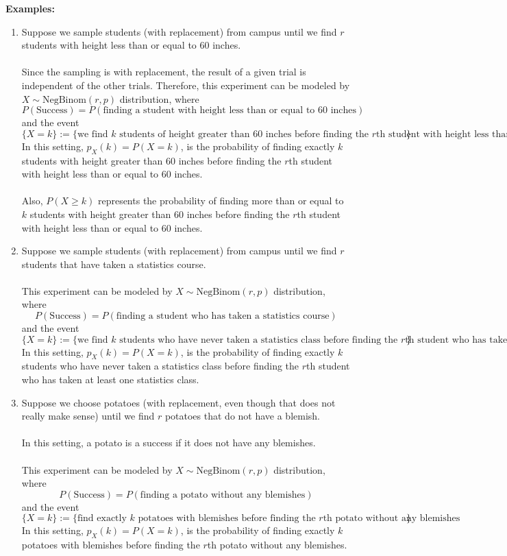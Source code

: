 \documentclass{article}
\begin{document}
\textbf{Examples:}
\begin{enumerate}
    \item Suppose we sample students (with replacement) from campus until we find \( r \) students with height less than or equal to 60 inches. \\\\
    Since the sampling is with replacement, the result of a given trial is independent of the other trials. Therefore, this experiment can be modeled by \( X \sim \text{NegBinom}(r, p) \) distribution, where
    \[
    P(\text{Success}) = P(\text{finding a student with height less than or equal to 60 inches})
    \]
    and the event
    \[
    \{ X = k \} := \{\text{we find $k$ students of height greater than 60 inches before finding the $r$th student with height less than or equal to 60 inches}\}
    \]
    In this setting, \( p_X(k) = P(X = k) \), is the probability of finding exactly \( k \) students with height greater than 60 inches before finding the \( r \)th student with height less than or equal to 60 inches. \\\\
    Also, \( P(X \ge k) \) represents the probability of finding more than or equal to \( k \) students with height greater than 60 inches before finding the \( r \)th student with height less than or equal to 60 inches.

    \item Suppose we sample students (with replacement) from campus until we find \( r \) students that have taken a statistics course. \\\\
    This experiment can be modeled by \( X \sim \text{NegBinom}(r, p) \) distribution, where
    \[
    P(\text{Success}) = P(\text{finding a student who has taken a statistics course})
    \]
    and the event
    \[
    \{ X = k \} := \{\text{we find $k$ students who have never taken a statistics class before finding the $r$th student who has taken at least one statistics class}\}
    \]
    In this setting, \( p_X(k) = P(X = k) \), is the probability of finding exactly \( k \) students who have never taken a statistics class before finding the \( r \)th student who has taken at least one statistics class.

    \item Suppose we choose potatoes (with replacement, even though that does not really make sense) until we find \( r \) potatoes that do not have a blemish. \\\\
    In this setting, a potato is a success if it does not have any blemishes. \\\\
    This experiment can be modeled by \( X \sim \text{NegBinom}(r, p) \) distribution, where
    \[
    P(\text{Success}) = P(\text{finding a potato without any blemishes})
    \]
    and the event
    \[
    \{ X = k \} := \{\text{find exactly $k$ potatoes with blemishes before finding the $r$th potato without any blemishes}\}
    \]
    In this setting, \( p_X(k) = P(X = k) \), is the probability of finding exactly \( k \) potatoes with blemishes before finding the \( r \)th potato without any blemishes.
\end{enumerate}
\end{document}
